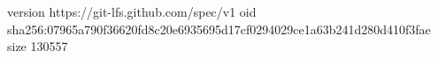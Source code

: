 version https://git-lfs.github.com/spec/v1
oid sha256:07965a790f36620fd8c20e6935695d17cf0294029ce1a63b241d280d410f3fae
size 130557
